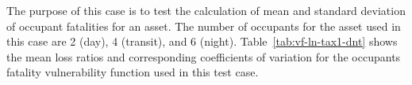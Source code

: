 The purpose of this case is to test the calculation of mean and standard deviation of occupant fatalities for an asset. The number of occupants for the asset used in this case are 2 (day), 4 (transit), and 6 (night). Table~\ref{tab:vf-ln-tax1-dnt} shows the mean loss ratios and corresponding coefficients of variation for the occupants fatality vulnerability function used in this test case.


